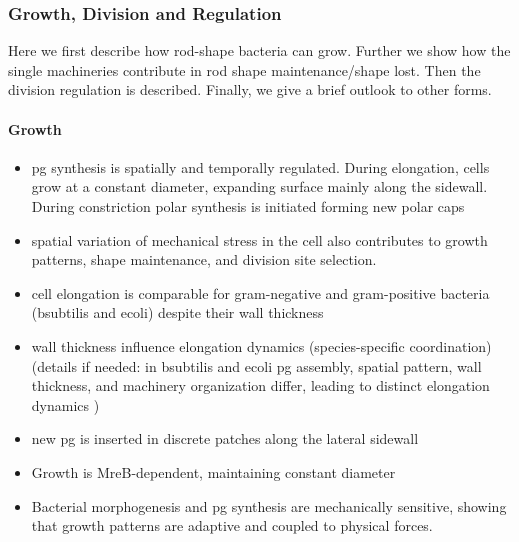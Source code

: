\documentclass{article}
\begin{document}
\subsubsection{Growth, Division and Regulation}
Here we first describe how rod-shape bacteria can grow. Further we show how the single machineries contribute in rod shape maintenance/shape lost. Then the division regulation is described. Finally, we give a brief outlook to other forms.

\paragraph{Growth}
\begin{itemize}
    \item \cite{Cooper1991} \cite{Wang2010_2} \ac{pg} synthesis is spatially and temporally regulated. During elongation, cells grow at a constant diameter, expanding surface mainly along the sidewall. During constriction polar synthesis is initiated forming new polar caps
    \item \cite{Chatterjee1988} spatial variation of mechanical stress in the cell also contributes to growth patterns, shape maintenance, and division site selection.
    \item \cite{Chang2014} cell elongation is comparable for gram-negative and gram-positive bacteria (\ac{bsubtilis} and \ac{ecoli}) despite their wall thickness
    \item \cite{Billaudeau2017} wall thickness influence elongation dynamics (species-specific coordination) (details if needed: in \ac{bsubtilis} and \ac{ecoli} \ac{pg} assembly, spatial pattern, wall thickness, and machinery organization differ, leading to distinct elongation dynamics )
    \item \cite{DePedro2003} new \ac{pg} is inserted in discrete patches along the lateral sidewall
    \item \cite{Billaudeau2017} Growth is MreB-dependent, maintaining constant diameter
    \item \cite{Si2015} Bacterial morphogenesis and \ac{pg} synthesis are mechanically sensitive, showing that growth patterns are adaptive and coupled to physical forces.
\end{itemize}
\end{document}
